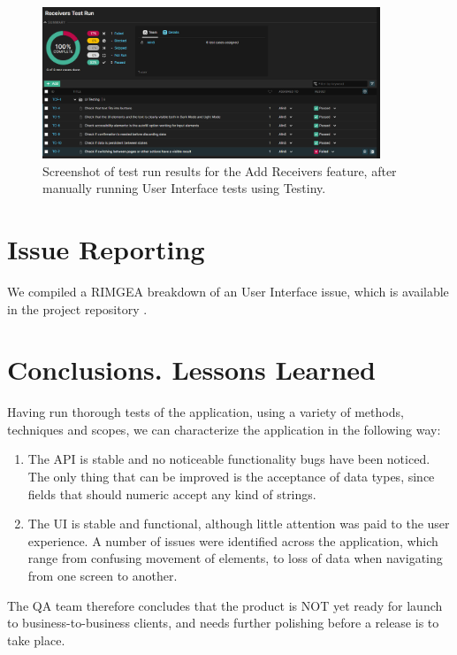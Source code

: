 \documentclass{article}
\begin{document}
\begin{figure}[htbp]
    \centering
    \includegraphics[width=0.9\textwidth]{./figures/testiny-receivers.png}
    \caption{Screenshot of test run results for the Add Receivers feature, after manually running User Interface tests using Testiny.}
    \label{FigReportTestinyReceivers}
\end{figure}

\section{Issue Reporting}

We compiled a RIMGEA breakdown of an User Interface issue, which is available in the project repository \cite{RIMGEAReport}.

\section{Conclusions. Lessons Learned}

Having run thorough tests of the application, using a variety of methods, techniques and scopes, we can characterize the application in the following way:

\begin{enumerate}
    \item The API is stable and no noticeable functionality bugs have been noticed. The only thing that can be improved is the acceptance of data types, since fields that should numeric accept any kind of strings.
    \item The UI is stable and functional, although little attention was paid to the user experience. A number of issues were identified across the application, which range from confusing movement of elements, to loss of data when navigating from one screen to another.
\end{enumerate}

The QA team therefore concludes that the product is NOT yet ready for launch to business-to-business clients, and needs further polishing before a release is to take place.

\newpage

\end{document}
